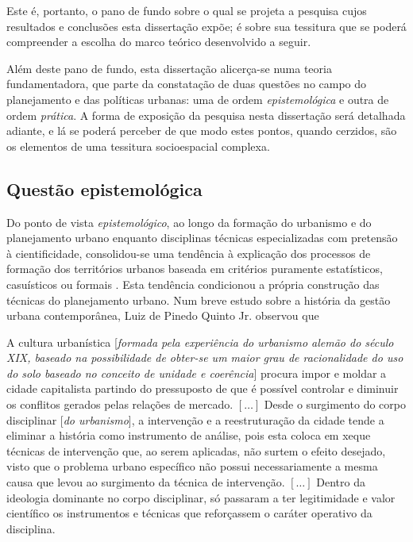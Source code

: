 Este é, portanto, o pano de fundo sobre o qual se projeta a pesquisa cujos resultados e conclusões esta dissertação expõe; é sobre sua tessitura que se poderá compreender a escolha do marco teórico desenvolvido a seguir.

Além deste pano de fundo, esta dissertação alicerça-se numa teoria fundamentadora, que parte da constatação de duas questões no campo do planejamento e das políticas urbanas: uma de ordem \textit{epistemológica} e outra de ordem \textit{prática}. A forma de exposição da pesquisa nesta dissertação será detalhada adiante, e lá se poderá perceber de que modo estes pontos, quando cerzidos, são os elementos de uma tessitura socioespacial complexa.

\subsection[Questão epistemológica]{Questão epistemológica}
\label{subsec:questepist}

Do ponto de vista \textit{epistemológico}, ao longo da formação do urbanismo e do planejamento urbano enquanto disciplinas técnicas especializadas com pretensão à cientificidade, consolidou-se uma tendência à explicação dos processos de formação dos territórios urbanos baseada em critérios puramente estatísticos, casuísticos ou formais \cite{benevolo_historia_1983, mumford_cidade_1998, hall_cidades_2007}. Esta tendência condicionou a própria construção das técnicas do planejamento urbano. Num breve estudo sobre a história da gestão urbana contemporânea, Luiz de Pinedo Quinto Jr. observou que 

\begin{citacao}
A cultura urbanística [\textit{formada pela experiência do urbanismo alemão do século XIX, baseado na possibilidade de obter-se um maior grau de racionalidade do uso do solo baseado no conceito de unidade e coerência}] procura impor e moldar a cidade capitalista partindo do pressuposto de que é possível controlar e diminuir os conflitos gerados pelas relações de mercado. \([\dots]\) Desde o surgimento do corpo disciplinar [\textit{do urbanismo}], a intervenção e a reestruturação da cidade tende a eliminar a história como instrumento de análise, pois esta coloca em xeque técnicas de intervenção que, ao serem aplicadas, não surtem o efeito desejado, visto que o problema urbano específico não possui necessariamente a mesma causa que levou ao surgimento da técnica de intervenção. \([\dots]\) Dentro da ideologia dominante no corpo disciplinar, só passaram a ter legitimidade e valor científico os instrumentos e técnicas que reforçassem o caráter operativo da disciplina. \cite{QUINTOJR1990}
\end{citacao}

